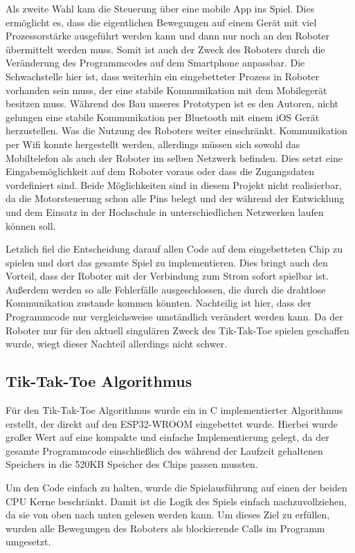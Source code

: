 \documentclass[conference,compsoc,final,a4paper]{IEEEtran}
\begin{document}
Als zweite Wahl kam die Steuerung über eine mobile App ins Spiel. Dies ermöglicht es, dass die
eigentlichen Bewegungen auf einem Gerät mit viel Prozessorstärke ausgeführt werden kann und dann nur
noch an den Roboter übermittelt werden muss. Somit ist auch der Zweck des Roboters
durch die Veränderung des Programmcodes auf dem Smartphone anpassbar. Die Schwachstelle hier ist,
dass weiterhin ein eingebetteter Prozess in Roboter vorhanden sein muss, der eine stabile
Kommunikation mit dem Mobilegerät besitzen muss. Während des Bau unseres Prototypen ist es den Autoren,
nicht gelungen eine stabile Kommunikation per Bluetooth mit einem iOS Gerät herzustellen.
Was die Nutzung des Roboters weiter einschränkt. Kommunikation per Wifi konnte hergestellt werden,
allerdings müssen sich sowohl das Mobiltelefon als auch der Roboter im 
selben Netzwerk befinden. Dies setzt eine Eingabemöglichkeit auf dem Roboter voraus oder dass
die Zugangsdaten vordefiniert sind. Beide Möglichkeiten sind in diesem Projekt nicht realisierbar,
da die Motorsteuerung schon alle Pins belegt und der während der Entwicklung und dem Einsatz in der
Hochschule in unterschiedlichen Netzwerken laufen können soll.

Letzlich fiel die Entscheidung darauf allen Code auf dem eingebetteten Chip zu spielen und dort
das gesamte Spiel zu implementieren. Dies bringt auch den Vorteil, dass der Roboter mit der Verbindung
zum Strom sofort spielbar ist. Außerdem werden so alle Fehlerfälle ausgeschlossen, die durch die
drahtlose Kommunikation zustande kommen könnten. Nachteilig ist hier, dass der Programmcode nur
vergleichsweise umständlich verändert werden kann. Da der Roboter nur für den aktuell singulären
Zweck des Tik-Tak-Toe spielen geschaffen wurde, wiegt dieser Nachteil allerdings nicht schwer.

\subsection{Tik-Tak-Toe Algorithmus}

Für den Tik-Tak-Toe Algorithmus wurde ein in C implementierter Algorithmus erstellt, der direkt auf
den ESP32-WROOM eingebettet wurde. Hierbei wurde großer Wert auf eine kompakte und einfache
Implementierung gelegt, da der gesamte Programmcode einschließlich des während der Laufzeit
gehaltenen Speichers in die 520KB Speicher des Chips passen mussten.

Um den Code einfach zu halten, wurde die Spielausführung auf einen der beiden CPU Kerne beschränkt.
Damit ist die Logik des Spiels einfach nachzuvollziehen, da sie von oben nach unten gelesen werden kann.
Um dieses Ziel zu erfüllen, wurden alle Bewegungen des Roboters als blockierende Calls im Programm
umgesetzt.
\end{document}
